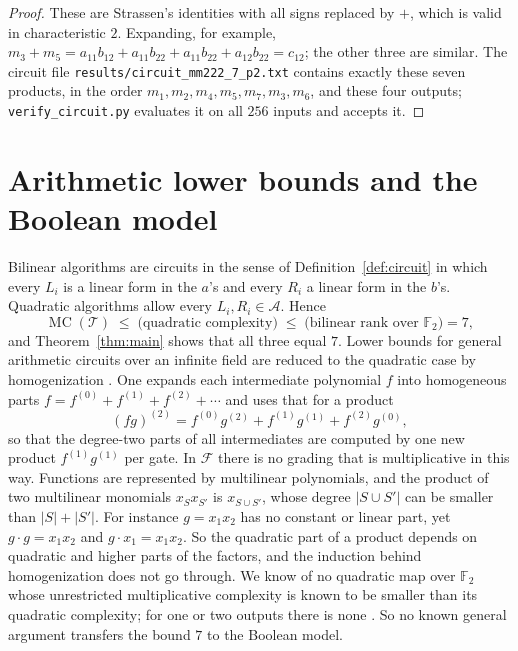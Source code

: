 \documentclass[11pt,a4paper]{article}
\theoremstyle{definition}
\newcommand{\F}{\mathbb{F}}
\newcommand{\Fn}{\mathcal{F}}
\newcommand{\Aff}{\mathcal{A}}
\newcommand{\Tg}{\mathcal{T}}
\newcommand{\MC}{\operatorname{MC}}
\newcommand{\code}[1]{\texttt{#1}}
\begin{document}
\begin{proof}
These are Strassen's identities \cite{Strassen69} with all signs replaced by $+$, which is valid in characteristic $2$. Expanding, for example, $m_3+m_5=a_{11}b_{12}+a_{11}b_{22}+a_{11}b_{22}+a_{12}b_{22}=c_{12}$; the other three are similar. The circuit file \code{results/circuit\_mm222\_7\_p2.txt} contains exactly these seven products, in the order $m_1,m_2,m_4,m_5,m_7,m_3,m_6$, and these four outputs; \code{verify\_circuit.py} evaluates it on all $256$ inputs and accepts it.
\end{proof}

\section{Arithmetic lower bounds and the Boolean model}\label{sec:arith}

Bilinear algorithms are circuits in the sense of Definition~\ref{def:circuit} in which every $L_i$ is a linear form in the $a$'s and every $R_i$ a linear form in the $b$'s. Quadratic algorithms allow every $L_i,R_i\in\Aff$. Hence
\[
\MC(\Tg)\;\le\;\text{(quadratic complexity)}\;\le\;\text{(bilinear rank over }\F_2)=7 ,
\]
and Theorem~\ref{thm:main} shows that all three equal $7$.
Lower bounds for general arithmetic circuits over an infinite field are reduced to the quadratic case by homogenization \cite{Strassen73}. One expands each intermediate polynomial $f$ into homogeneous parts $f=f^{(0)}+f^{(1)}+f^{(2)}+\cdots$ and uses that for a product
\[
(fg)^{(2)}=f^{(0)}g^{(2)}+f^{(1)}g^{(1)}+f^{(2)}g^{(0)} ,
\]
so that the degree-two parts of all intermediates are computed by one new product $f^{(1)}g^{(1)}$ per gate. In $\Fn$ there is no grading that is multiplicative in this way. Functions are represented by multilinear polynomials, and the product of two multilinear monomials $x_Sx_{S'}$ is $x_{S\cup S'}$, whose degree $|S\cup S'|$ can be smaller than $|S|+|S'|$. For instance $g=x_1x_2$ has no constant or linear part, yet $g\cdot g=x_1x_2$ and $g\cdot x_1=x_1x_2$. So the quadratic part of a product depends on quadratic and higher parts of the factors, and the induction behind homogenization does not go through. We know of no quadratic map over $\F_2$ whose unrestricted multiplicative complexity is known to be smaller than its quadratic complexity; for one or two outputs there is none \cite{MirwaldSchnorr92}. So no known general argument transfers the bound $7$ to the Boolean model.
\end{document}
